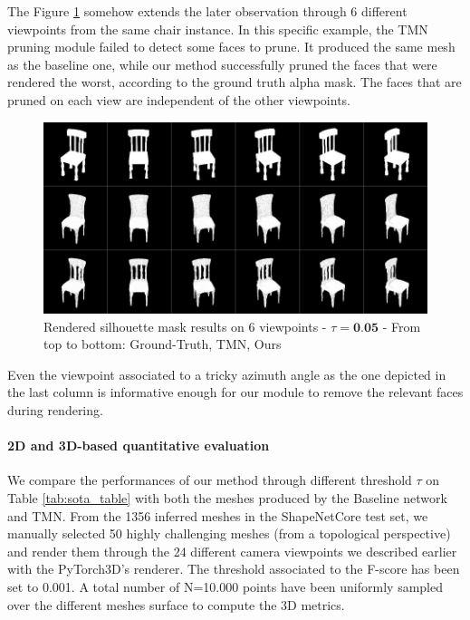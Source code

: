The Figure \ref{fig:pruning_multi_view} somehow extends the later observation through 6 different viewpoints from the same chair instance. In this specific example, the TMN pruning module failed to detect some faces to prune. It produced the same mesh as the baseline one, while our method successfully pruned the faces that were rendered the worst, according to the ground truth alpha mask. The faces that are pruned on each view are independent of the other viewpoints. 

\begin{figure}[htp!]%
\begin{center}
\includegraphics[width=\linewidth]{images/adaptativesr/severalview2D.png}
\end{center}
    \caption{Rendered silhouette mask results on 6 viewpoints - $\tau =\textbf{0.05}$ - From top to bottom: Ground-Truth, TMN\citep{pan2019deep},  Ours}
\label{fig:pruning_multi_view}
\end{figure}

Even the viewpoint associated to a tricky azimuth angle as the one depicted in the last column is informative enough for our module to remove the relevant faces during rendering.

\paragraph{2D and 3D-based quantitative evaluation}

We compare the performances of our method through different threshold $\tau$ on Table \ref{tab:sota_table} with both the meshes produced by the Baseline network and TMN\citep{pan2019deep}. From the 1356 inferred meshes in the ShapeNetCore\citep{chang2015shapenet} test set, we manually selected 50 highly challenging meshes (from a topological perspective) and render them through the 24 different camera viewpoints we described earlier with the PyTorch3D's renderer. The threshold associated to the F-score has been set to 0.001. A total number of N=10.000 points have been uniformly sampled over the different meshes surface to compute the 3D metrics. 

